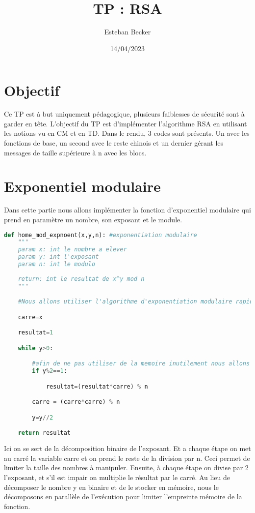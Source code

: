 \documentclass[12pt]{article}
\author{Esteban Becker}
\date{14/04/2023}
\title{TP : RSA}
\begin{document}
\maketitle

\tableofcontents
\newpage

\section*{Objectif}

Ce TP est à but uniquement pédagogique, plusieurs faiblesses de sécurité sont à garder en tête.
L'objectif du TP est d'implémenter l'algorithme RSA en utilisant les notions vu en CM et en TD.
Dans le rendu, 3 codes sont présents. Un avec les fonctions de base, un second avec le reste chinois et un dernier gérant les messages de taille supérieure à n avec les blocs.

\section{Exponentiel modulaire}

Dans cette partie nous allons implémenter la fonction d'exponentiel modulaire qui prend en paramètre un nombre, son exposant et le module.

\begin{lstlisting}[language=python]
    def home_mod_expnoent(x,y,n): #exponentiation modulaire
    """
    param x: int le nombre a elever
    param y: int l'exposant
    param n: int le modulo
    
    return: int le resultat de x^y mod n
    """

    #Nous allons utiliser l'algorithme d'exponentiation modulaire rapide

    carre=x

    resultat=1

    while y>0:

        #afin de ne pas utiliser de la memoire inutilement nous allons a chaque iteration calculer si y est pair ou impair puis le diviser par 2
        if y%2==1:

            resultat=(resultat*carre) % n

        carre = (carre*carre) % n

        y=y//2

    return resultat
\end{lstlisting}

Ici on se sert de la décomposition binaire de l'exposant. Et a chaque étape on met au carré la variable carre et on prend le reste de la division par n. Ceci permet de limiter la taille des nombres à manipuler. Ensuite, à chaque étape on divise par 2 l'exposant, et s'il est impair on multiplie le résultat par le carré.
Au lieu de décomposer le nombre y en binaire et de le stocker en mémoire, nous le décomposons en parallèle de l'exécution pour limiter l'empreinte mémoire de la fonction.
\end{document}
